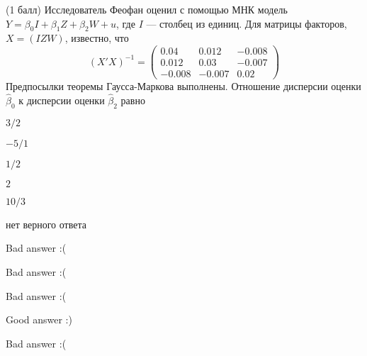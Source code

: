 
\begin{question}
(1 балл) Исследователь Феофан оценил с помощью МНК модель
\(Y = \beta_0 I + \beta_1 Z + \beta_2 W + u\), где \(I\) --- столбец из
единиц. Для матрицы факторов, \(X = (I Z W)\), известно, что \[
(X'X)^{-1} = \begin{pmatrix}
0.04 & 0.012 & -0.008 \\
0.012 & 0.03 & -0.007 \\
-0.008 & -0.007 & 0.02
\end{pmatrix}
\] Предпосылки теоремы Гаусса-Маркова выполнены. Отношение дисперсии
оценки \(\hat \beta_0\) к дисперсии оценки \(\hat \beta_2\) равно
\begin{answerlist}
  \item \(3/2\)
  \item \(-5/1\)
  \item \(1/2\)
  \item \(2\)
  \item \(10/3\)
  \item нет верного ответа
\end{answerlist}
\end{question}

\begin{solution}
\begin{answerlist}
  \item Bad answer :(
  \item Bad answer :(
  \item Bad answer :(
  \item Good answer :)
  \item Bad answer :(
\end{answerlist}
\end{solution}
